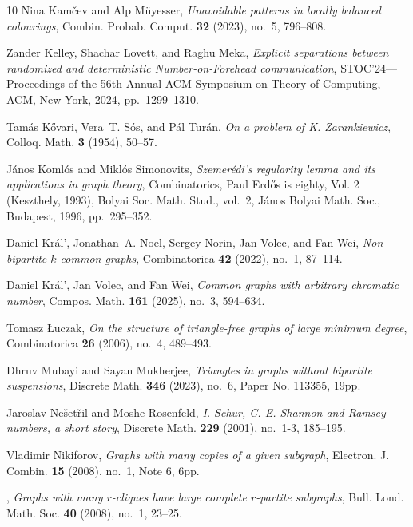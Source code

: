 \documentclass[11pt]{article}
\numberwithin{equation}{section}
\theoremstyle{plain}
\theoremstyle{remark}
\begin{document}
\begin{thebibliography}{10}
Nina Kam\v{c}ev and Alp M\"{u}yesser, \emph{Unavoidable patterns in locally
  balanced colourings}, Combin. Probab. Comput. \textbf{32} (2023), no.~5,
  796--808. 

Zander Kelley, Shachar Lovett, and Raghu Meka, \emph{Explicit separations
  between randomized and deterministic {N}umber-on-{F}orehead communication},
  S{TOC}'24---{P}roceedings of the 56th {A}nnual {ACM} {S}ymposium on {T}heory
  of {C}omputing, ACM, New York, 2024, pp.~1299--1310. 

Tam\'{a}s K\H{o}vari, Vera~T. S\'{o}s, and P\'{a}l Tur\'{a}n, \emph{On a
  problem of {K}. {Z}arankiewicz}, Colloq. Math. \textbf{3} (1954), 50--57.

J\'{a}nos Koml\'os and Mikl\'{o}s Simonovits, \emph{Szemer\'edi's regularity
  lemma and its applications in graph theory}, Combinatorics, {P}aul {E}rd\H os
  is eighty, {V}ol. 2 ({K}eszthely, 1993), Bolyai Soc. Math. Stud., vol.~2,
  J\'anos Bolyai Math. Soc., Budapest, 1996, pp.~295--352. 

Daniel Kr\'al', Jonathan~A. Noel, Sergey Norin, Jan Volec, and Fan Wei,
  \emph{Non-bipartite $k$-common graphs}, Combinatorica \textbf{42} (2022),
  no.~1, 87--114. 

Daniel Kr\'al', Jan Volec, and Fan Wei, \emph{Common graphs with arbitrary
  chromatic number}, Compos. Math. \textbf{161} (2025), no.~3, 594--634.

Tomasz \L{}uczak, \emph{On the structure of triangle-free graphs of large
  minimum degree}, Combinatorica \textbf{26} (2006), no.~4, 489--493.

Dhruv Mubayi and Sayan Mukherjee, \emph{Triangles in graphs without bipartite
  suspensions}, Discrete Math. \textbf{346} (2023), no.~6, Paper No. 113355,
  19pp. 

Jaroslav Ne\v{s}et\v{r}il and Moshe Rosenfeld, \emph{I. {S}chur, {C}. {E}.
  {S}hannon and {R}amsey numbers, a short story}, Discrete Math. \textbf{229}
  (2001), no.~1-3, 185--195. 

Vladimir Nikiforov, \emph{Graphs with many copies of a given subgraph},
  Electron. J. Combin. \textbf{15} (2008), no.~1, Note 6, 6pp. 

\bysame, \emph{Graphs with many {$r$}-cliques have large complete {$r$}-partite
  subgraphs}, Bull. Lond. Math. Soc. \textbf{40} (2008), no.~1, 23--25.


\end{thebibliography}
\end{document}
